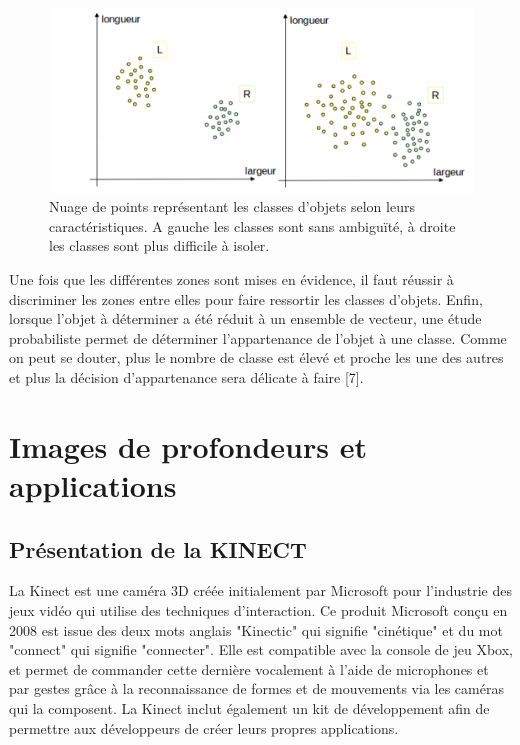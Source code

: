 \documentclass[12pt,a4paper,oneside]{book}
\begin{document}
	\begin{figure}[H]
		\centering
		\includegraphics[scale=1]{images/chaptre1.png}
		\caption{Nuage de points représentant les classes d’objets selon leurs caractéristiques.
			A gauche les classes sont sans ambiguïté, à droite les classes sont plus difficile à isoler.}
		\label{fig1n}
	\end{figure}
	
	Une fois que les différentes zones sont mises en évidence, il faut réussir à discriminer les zones entre elles pour faire ressortir les classes d’objets. Enfin, lorsque l’objet à déterminer a été réduit à un ensemble de vecteur, une étude probabiliste permet de déterminer l’appartenance de l’objet à une classe. Comme on peut se douter, plus le nombre de classe est élevé et proche	les une des autres et plus la décision d’appartenance sera délicate à faire [7].
	
	\section{Images de profondeurs et applications}
	
	\subsection{Présentation de la KINECT}
	La Kinect est une caméra 3D créée initialement par Microsoft pour l’industrie des jeux vidéo qui utilise des techniques d'interaction. Ce produit Microsoft conçu en 2008 est issue des deux mots anglais "Kinectic" qui signifie "cinétique" et du mot "connect" qui signifie "connecter". Elle est compatible avec la console de jeu Xbox, et permet de commander cette dernière vocalement à l’aide de microphones et par gestes grâce à la reconnaissance de formes et de mouvements via les caméras qui la composent.
	La Kinect inclut également un kit de développement afin de permettre aux développeurs de créer leurs propres applications.
	
\end{document}
